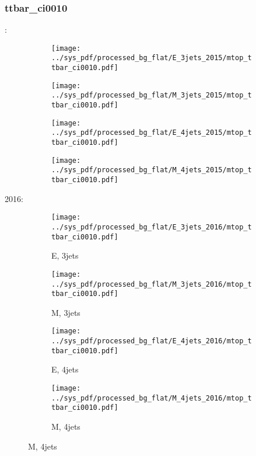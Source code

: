 \documentclass{beamer}
\begin{document}
\begin{frame}
\frametitle{ttbar_ci0010}
\fontsize{5}{1}:
\begin{figure}
\centering
\begin{subfigure}[b]{0.24\textwidth}
\texttt{[image: ../sys\_pdf/processed\_bg\_flat/E\_3jets\_2015/mtop\_ttbar\_ci0010.pdf]}
\end{subfigure}
\begin{subfigure}[b]{0.24\textwidth}
\texttt{[image: ../sys\_pdf/processed\_bg\_flat/M\_3jets\_2015/mtop\_ttbar\_ci0010.pdf]}
\end{subfigure}
\begin{subfigure}[b]{0.24\textwidth}
\texttt{[image: ../sys\_pdf/processed\_bg\_flat/E\_4jets\_2015/mtop\_ttbar\_ci0010.pdf]}
\end{subfigure}
\begin{subfigure}[b]{0.24\textwidth}
\texttt{[image: ../sys\_pdf/processed\_bg\_flat/M\_4jets\_2015/mtop\_ttbar\_ci0010.pdf]}
\end{subfigure}
\end{figure}
2016:
\begin{figure}
\centering
\begin{subfigure}[b]{0.24\textwidth}
\texttt{[image: ../sys\_pdf/processed\_bg\_flat/E\_3jets\_2016/mtop\_ttbar\_ci0010.pdf]}
\captionsetup{font=tiny}
\caption{E, 3jets}
\end{subfigure}
\begin{subfigure}[b]{0.24\textwidth}
\texttt{[image: ../sys\_pdf/processed\_bg\_flat/M\_3jets\_2016/mtop\_ttbar\_ci0010.pdf]}
\captionsetup{font=tiny}
\caption{M, 3jets}
\end{subfigure}
\begin{subfigure}[b]{0.24\textwidth}
\texttt{[image: ../sys\_pdf/processed\_bg\_flat/E\_4jets\_2016/mtop\_ttbar\_ci0010.pdf]}
\captionsetup{font=tiny}
\caption{E, 4jets}
\end{subfigure}
\begin{subfigure}[b]{0.24\textwidth}
\texttt{[image: ../sys\_pdf/processed\_bg\_flat/M\_4jets\_2016/mtop\_ttbar\_ci0010.pdf]}
\captionsetup{font=tiny}
\caption{M, 4jets}
\end{subfigure}
\end{figure}
\end{frame}
\end{document}
